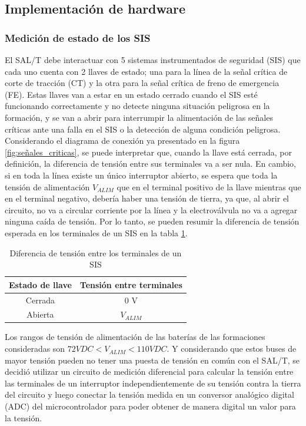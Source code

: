 \subsection{Implementación de hardware}
\subsubsection{Medición de estado de los SIS}

El SAL/T debe interactuar con 5 sistemas instrumentados de seguridad (SIS) que cada uno cuenta con 2 llaves de estado; una para la línea de la señal crítica de corte de tracción (CT) y la otra para la señal crítica de freno de emergencia (FE). Estas llaves van a estar en un estado cerrado cuando el SIS esté funcionando correctamente y no detecte ninguna situación peligrosa en la formación, y se van a abrir para interrumpir la alimentación de las señales críticas ante una falla en el SIS o la detección de alguna condición peligrosa. \\ 

Considerando el diagrama de conexión ya presentado en la figura \ref{fig:señales_criticas}, se puede interpretar que, cuando la llave está cerrada, por definición, la diferencia de tensión entre sus terminales va a ser nula. En cambio, si en toda la línea existe un único interruptor abierto, se espera que toda la tensión de alimentación $V_{ALIM}$ que en el terminal positivo de la llave mientras que en el terminal negativo, debería haber una tensión de tierra, ya que, al abrir el circuito, no va a circular corriente por la línea y la electroválvula no va a agregar ninguna caída de tensión. Por lo tanto, se pueden resumir la diferencia de tensión esperada en los terminales de un SIS en la tabla \ref{tab:switch_state}. 

\begin{table}[htb]
    \begin{tabular}{|c|c|} 
        \hline
        \textbf{Estado de llave} & \textbf{Tensión entre terminales}\\
        \hline
        Cerrada     &     0 V   \\
        \hline
        Abierta     &     $V_{ALIM}$ \\
        \hline
    \end{tabular}
    \label{tab:switch_state}
    \caption{Diferencia de tensión entre los terminales de un SIS}
\end{table}

Los rangos de tensión de alimentación de las baterías de las formaciones consideradas son $ 72 VDC < V_{ALIM} < 110 VDC $. Y considerando que estos buses de mayor tensión pueden no tener una puesta de tensión en común con el SAL/T, se decidió utilizar un circuito de medición diferencial para calcular la tensión entre las terminales de un interruptor independientemente de su tensión contra la tierra del circuito y luego conectar la tensión medida en un conversor analógico digital (ADC) del microcontrolador para poder obtener de manera digital un valor para la tensión. \\ 


